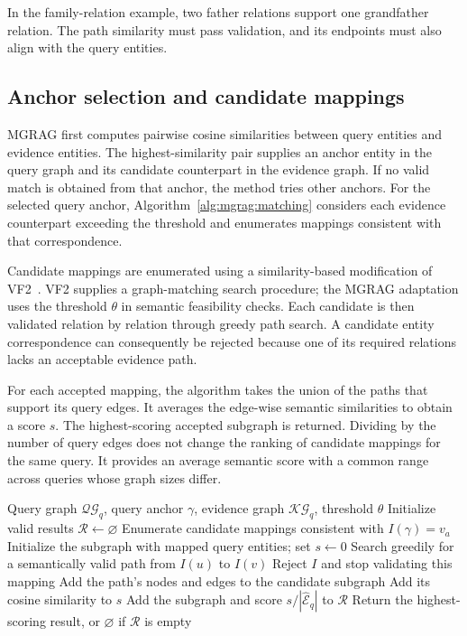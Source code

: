 In the family-relation example, two father relations support one grandfather relation. The path similarity must pass validation, and its endpoints must also align with the query entities.

\subsection{Anchor selection and candidate mappings}

MGRAG first computes pairwise cosine similarities between query entities and evidence entities. The highest-similarity pair supplies an anchor entity in the query graph and its candidate counterpart in the evidence graph. If no valid match is obtained from that anchor, the method tries other anchors. For the selected query anchor, Algorithm~\ref{alg:mgrag:matching} considers each evidence counterpart exceeding the threshold and enumerates mappings consistent with that correspondence.

Candidate mappings are enumerated using a similarity-based modification of VF2~\cite{mgrag-cordella2004sub}. VF2 supplies a graph-matching search procedure; the MGRAG adaptation uses the threshold $\theta$ in semantic feasibility checks. Each candidate is then validated relation by relation through greedy path search. A candidate entity correspondence can consequently be rejected because one of its required relations lacks an acceptable evidence path.

For each accepted mapping, the algorithm takes the union of the paths that support its query edges. It averages the edge-wise semantic similarities to obtain a score $s$. The highest-scoring accepted subgraph is returned. Dividing by the number of query edges does not change the ranking of candidate mappings for the same query. It provides an average semantic score with a common range across queries whose graph sizes differ.

\begin{algorithm}[tbp]
\caption{Path-based semantic matching in MGRAG}
\label{alg:mgrag:matching}
\begin{algorithmic}[1]
\REQUIRE Query graph $\mathcal{QG}_q$, query anchor $\gamma$, evidence graph $\mathcal{KG}_q$, threshold $\theta$
\STATE Initialize valid results $\mathcal R\gets\varnothing$
\STATE Enumerate candidate mappings consistent with $I(\gamma)=v_a$
\STATE Initialize the subgraph with mapped query entities; set $s\gets0$
\STATE Search greedily for a semantically valid path from $I(u)$ to $I(v)$
\STATE Reject $I$ and stop validating this mapping
\ELSE
\STATE Add the path's nodes and edges to the candidate subgraph
\STATE Add its cosine similarity to $s$
\ENDIF
\ENDFOR
{}
\STATE Add the subgraph and score $s/|\widehat{\mathcal E}_q|$ to $\mathcal R$
\ENDIF
\ENDFOR
\ENDFOR
\STATE Return the highest-scoring result, or $\varnothing$ if $\mathcal R$ is empty
\end{algorithmic}
\end{algorithm}

